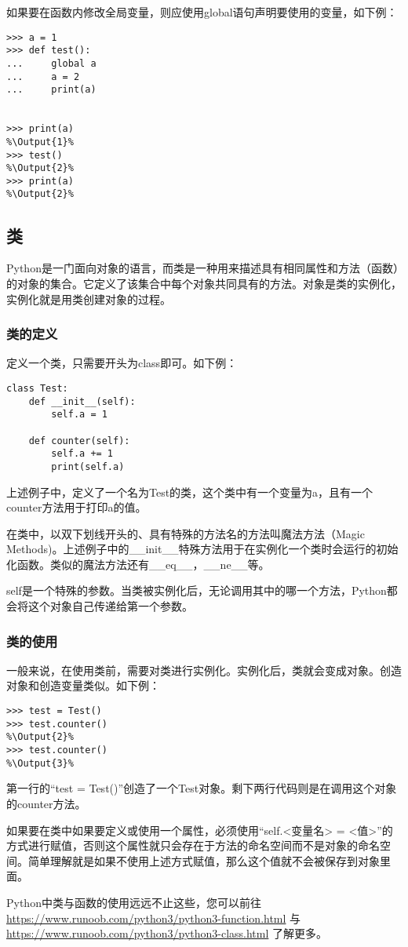 如果要在函数内修改全局变量，则应使用global语句声明要使用的变量，如下例：
\begin{lstlisting}
>>> a = 1
>>> def test():
...     global a
...     a = 2
...     print(a)


>>> print(a)
%\Output{1}%
>>> test()
%\Output{2}%
>>> print(a)
%\Output{2}%
\end{lstlisting}

\subsection{类}
Python是一门面向对象的语言，而类是一种用来描述具有相同属性和方法（函数）的对象的集合。它定义了该集合中每个对象共同具有的方法。对象是类的实例化，实例化就是用类创建对象的过程。

\subsubsection{类的定义}
定义一个类，只需要开头为class即可。如下例：

\begin{lstlisting}
class Test:
    def __init__(self):
        self.a = 1

    def counter(self):
        self.a += 1
        print(self.a)
\end{lstlisting}

上述例子中，定义了一个名为Test的类，这个类中有一个变量为a，且有一个counter方法用于打印a的值。
\begin{ExtraKnowledge}
    在类中，以双下划线开头的、具有特殊的方法名的方法叫魔法方法（Magic Methods)。上述例子中的\_\_init\_\_特殊方法用于在实例化一个类时会运行的初始化函数。类似的魔法方法还有\_\_eq\_\_，\_\_ne\_\_等。

    self是一个特殊的参数。当类被实例化后，无论调用其中的哪一个方法，Python都会将这个对象自己传递给第一个参数。
\end{ExtraKnowledge}

\subsubsection{类的使用}
一般来说，在使用类前，需要对类进行实例化。实例化后，类就会变成对象。创造对象和创造变量类似。如下例：

\begin{lstlisting}
>>> test = Test()
>>> test.counter()
%\Output{2}%
>>> test.counter()
%\Output{3}%
\end{lstlisting}

第一行的“test = Test()”创造了一个Test对象。剩下两行代码则是在调用这个对象的counter方法。

如果要在类中如果要定义或使用一个属性，必须使用“self.<变量名> = <值>”的方式进行赋值，否则这个属性就只会存在于方法的命名空间而不是对象的命名空间。简单理解就是如果不使用上述方式赋值，那么这个值就不会被保存到对象里面。

\begin{ExtraKnowledge}
    Python中类与函数的使用远远不止这些，您可以前往 \url{https://www.runoob.com/python3/python3-function.html} 与 \url{https://www.runoob.com/python3/python3-class.html} 了解更多。
\end{ExtraKnowledge}
